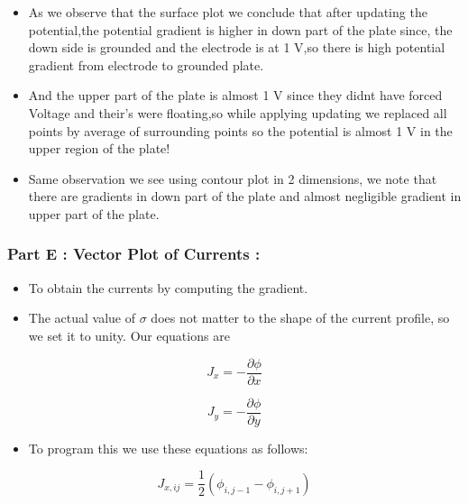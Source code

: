 \documentclass[a4paper,10pt]{article}
\providecommand{\tightlist}{%
      \setlength{\itemsep}{0pt}\setlength{\parskip}{0pt}}
\begin{document}
\begin{itemize}
\tightlist
\item
  As we observe that the surface plot we conclude that after updating
  the potential,the potential gradient is higher in down part of the
  plate since, the down side is grounded and the electrode is at 1 V,so
  there is high potential gradient from electrode to grounded plate.
\item
  And the upper part of the plate is almost 1 V since they didnt have
  forced Voltage and their's were floating,so while applying updating we
  replaced all points by average of surrounding points so the potential
  is almost 1 V in the upper region of the plate!
\item
  Same observation we see using contour plot in 2 dimensions, we note
  that there are gradients in down part of the plate and almost
  negligible gradient in upper part of the plate.
\end{itemize}

    \subsubsection{Part E : Vector Plot of Currents
:}\label{part-e-vector-plot-of-currents}

\begin{itemize}
\tightlist
\item
  To obtain the currents by computing the gradient.
\item
  The actual value of \(\sigma\) does not matter to the shape of the
  current profile, so we set it to unity. Our equations are
\end{itemize}

\begin{equation}
    J_x = -\frac{\partial \phi}{\partial x} 
  \end{equation}

\begin{equation}
    J_y = -\frac{\partial \phi}{\partial y} 
  \end{equation}

\begin{itemize}
\tightlist
\item
  To program this we use these equations as follows:
\end{itemize}

\begin{equation}
        J_{x,ij} = \frac{1}{2}(\phi_{i,j-1} - \phi_{i,j+1}) 
    \end{equation}
\end{document}
